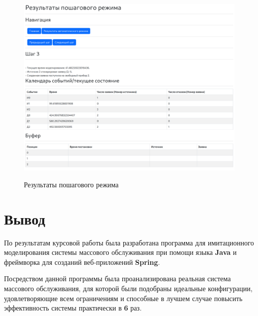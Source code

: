 \documentclass[a4paper, 14pt]{article}
\begin{document}
\begin{figure}[H]
	\centering
	\includegraphics[width=15cm]{screenshots/4.png}\\
	\caption{Результаты пошагового режима}
\end{figure}

\section{Вывод}

По результатам курсовой работы была разработана программа для имитационного моделирования системы массового обслуживания при помощи языка \textbf{Java} и фреймворка для созданий веб-приложений \textbf{Spring}.

Посредством данной программы была проанализирована реальная система массового обслуживания, для которой были подобраны идеальные конфигурации, удовлетворяющие всем ограничениям и способные в лучшем случае повысить эффективность системы практически в \textbf{6} раз.
\end{document}

